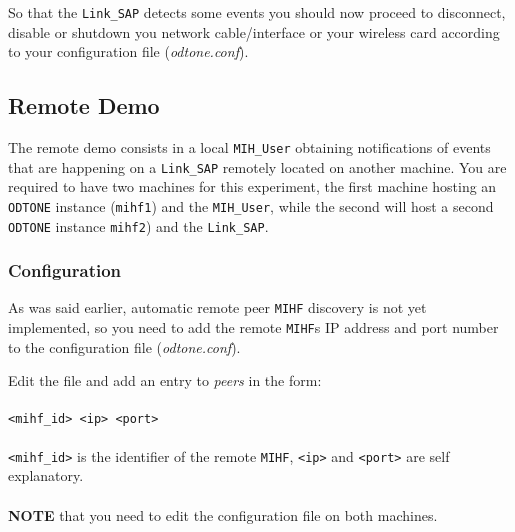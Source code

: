 \documentclass[11pt]{article}
\begin{document}
    So that the \texttt{Link\_SAP} detects some events you should now proceed to
    disconnect, disable or shutdown you network cable/interface or your wireless card according
    to your configuration file (\textit{odtone.conf}).

%


\subsection{Remote Demo}
\label{sec-2.2}

The remote demo consists in a local \texttt{MIH\_User} obtaining notifications of events
that are happening on a \texttt{Link\_SAP} remotely located on another machine.
You are required to have two machines for this experiment, the first machine hosting an \texttt{ODTONE}
instance (\texttt{mihf1}) and the \texttt{MIH\_User}, while the second will host a second \texttt{ODTONE}
instance \texttt{mihf2}) and the \texttt{Link\_SAP}.



\subsubsection{Configuration}
\label{sec-2.2.1}

    As was said earlier, automatic remote peer \texttt{MIHF} discovery is not
    yet implemented, so you need to add the remote \texttt{MIHF}s IP address and port
    number to the configuration file (\emph{odtone.conf}).

    Edit the file and add an entry to \emph{peers} in the form:\\
    \\
    \texttt{<mihf\_id> <ip> <port> \\}
    \\
    \texttt{<mihf\_id>} is the identifier of the remote \texttt{MIHF}, \texttt{<ip>}
    and \texttt{<port>} are self explanatory.\\
    \\
    \textbf{NOTE} that you need to edit the configuration file on both
    machines. \\
    \\
%
\end{document}

